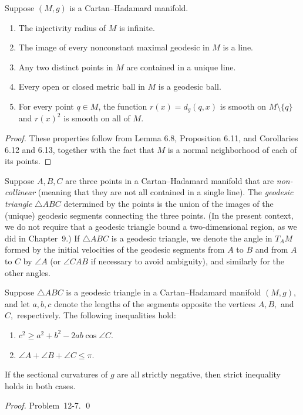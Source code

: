 \begin{proposition}
\label{prop:basic-properties-cartan-hadamard}
Suppose $(M, g)$ is a Cartan--Hadamard manifold.
\begin{enumerate}[label=(\alph*)]
\item The injectivity radius of $M$ is infinite.
\item The image of every nonconstant maximal geodesic in $M$ is a line.
\item Any two distinct points in $M$ are contained in a unique line.
\item Every open or closed metric ball in $M$ is a geodesic ball.
\item For every point $q \in M$, the function $r(x) = d_g(q, x)$ is smooth on $M \setminus \{q\}$ and $r(x)^2$ is smooth on all of $M$.
\end{enumerate}
\end{proposition}

\begin{proof}
These properties follow from Lemma 6.8, Proposition 6.11, and Corollaries 6.12 and 6.13, together with the fact that $M$ is a normal neighborhood of each of its points.
\end{proof}

Suppose $A, B, C$ are three points in a Cartan--Hadamard manifold that are \emph{non-collinear} (meaning that they are not all contained in a single line). The \emph{geodesic triangle} $\triangle ABC$ determined by the points is the union of the images of the (unique) geodesic segments connecting the three points. (In the present context, we do not require that a geodesic triangle bound a two-dimensional region, as we did in Chapter~9.) If $\triangle ABC$ is a geodesic triangle, we denote the angle in $T_A M$ formed by the initial velocities of the geodesic segments from $A$ to $B$ and from $A$ to $C$ by $\angle A$ (or $\angle CAB$ if necessary to avoid ambiguity), and similarly for the other angles.

\begin{proposition}
\label{prop:geodesic-triangle-inequalities}
Suppose $\triangle ABC$ is a geodesic triangle in a Cartan--Hadamard manifold $(M,g)$, and let $a, b, c$ denote the lengths of the segments opposite the vertices $A, B,$ and $C,$ respectively. The following inequalities hold:
\begin{enumerate}
\item[(a)] $c^2 \geq a^2 + b^2 - 2ab \cos \angle C$.
\item[(b)] $\angle A + \angle B + \angle C \leq \pi$.
\end{enumerate}
If the sectional curvatures of $g$ are all strictly negative, then strict inequality holds in both cases.

\textit{Proof.} Problem~12-7. \qed
\end{proposition}


